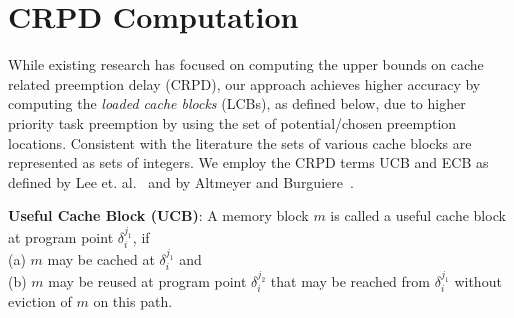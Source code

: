 \section{CRPD Computation}\label{sec:crpd_computation}

While existing research has focused on computing the upper bounds on cache related preemption delay (CRPD), our approach achieves higher accuracy by computing the \emph{loaded cache blocks} (LCBs), as defined below, due to higher priority task preemption by using the set of potential/chosen preemption locations.  Consistent with the literature the sets of various cache blocks are represented as sets of integers.  We employ the CRPD terms UCB and ECB as defined by Lee et. al.~\cite{lee:98} and by Altmeyer and Burguiere~\cite{altmeyer:11c}.

\begin{definition}
\textbf{Useful Cache Block (UCB)}: A memory block $m$ is called a useful cache block at program point \begin{math}\delta_{i}^{j_{1}}\end{math}, if \\(a) $m$ may be cached at \begin{math}\delta_{i}^{j_{1}}\end{math} and \\(b) $m$ may be reused at program point \begin{math}\delta_{i}^{j_{2}}\end{math} that may be reached from \begin{math}\delta_{i}^{j_{1}}\end{math} without eviction of $m$ on this path.
\end{definition}

